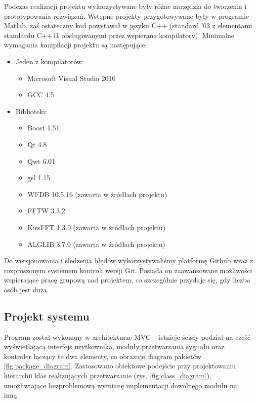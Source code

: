 \documentclass[a4paper, 11pt]{article}
\begin{document}
Podczas realizacji projektu wykorzystywane były różne narzędzia do tworzenia i prototypowania rozwiązań. Wstępne projekty przygotowywane były w programie Matlab, zaś ostateczny kod powstawał w języku C++ (standard '03 z elementami standardu C++11 obsługiwanymi przez wspierane kompilatory).
Minimalne wymagania kompilacji projektu są następujące:
\begin{itemize}
  \item Jeden z kompilatorów:
  \begin{itemize}
    \item Microsoft Visual Studio 2010
    \item GCC 4.5
  \end{itemize}
  \item Biblioteki:
  \begin{itemize}
    \item Boost 1.51
    \item Qt 4.8
    \item Qwt 6.01
    \item gsl 1.15
    \item WFDB 10.5.16 (zawarta w źródłach projektu)
    \item FFTW 3.3.2
   \item KissFFT 1.3.0  (zawarta w źródłach projektu)
   \item ALGLIB 3.7.0   (zawarta w źródłach projektu)
  \end{itemize}
\end{itemize}

Do wersjonowania i śledzenia błędów wykorzystywaliśmy platformę Github wraz z rozproszonym systemem kontroli wersji Git. Posiada on zaawansowane możliwości wspierające pracę grupową nad projektem, co szczególnie przydaje się, gdy liczba osób jest duża.

\subsection{Projekt systemu}
\label{sec:sys_proj}

Program został wykonany w architekturze MVC -- istnieje ścisły podział na część wyświetlającą interfejs użytkownika, moduły przetwarzania sygnału oraz kontroler łączący te dwa elementy, co obrazuje diagram pakietów \ref{fig:package_diagram}. Zastosowano obiektowe podejście przy projektowaniu hierarchii klas realizujących przetwarzanie (rys. \ref{fig:class_diagram}), umożliwiające bezproblemową wymianę implementacji dowolnego modułu na inną.
\end{document}
